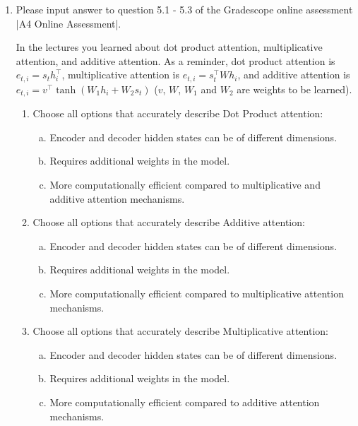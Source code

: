 \begin{enumerate}[1.]
\begin{enumerate}[4a.]

\end{enumerate}

\item
Please input answer to question 5.1 - 5.3 of the Gradescope online assessment |A4 Online Assessment|.

In the lectures you learned about dot product attention, multiplicative attention, and additive attention. As a reminder, dot product attention is $e_{t,i} = s_t h_i^\intercal$, multiplicative attention is $e_{t,i} = s_t^\intercal W h_i$, and additive attention is $e_{t,i} = v^\intercal \tanh(W_1 h_i + W_2 s_t)$  ($v$, $W$, $W_1$ and $W_2$ are weights to be learned).
\begin{enumerate}[5a.]
\item {}

Choose all options that accurately describe Dot Product attention:

\begin{enumerate}[(a)]
\item Encoder and decoder hidden states can be of different dimensions.
\item Requires additional weights in the model.
\item More computationally efficient compared to multiplicative and additive attention mechanisms.
\end{enumerate}


\item {}

Choose all options that accurately describe Additive attention:

\begin{enumerate}[(a))]
\item Encoder and decoder hidden states can be of different dimensions.
\item Requires additional weights in the model.
\item More computationally efficient compared to multiplicative attention mechanisms.
\end{enumerate}


\item {}

Choose all options that accurately describe Multiplicative attention:

\begin{enumerate}[(a)]
\item Encoder and decoder hidden states can be of different dimensions.
\item Requires additional weights in the model.
\item More computationally efficient compared to additive attention mechanisms.
\end{enumerate}

\end{enumerate}
\end{enumerate}